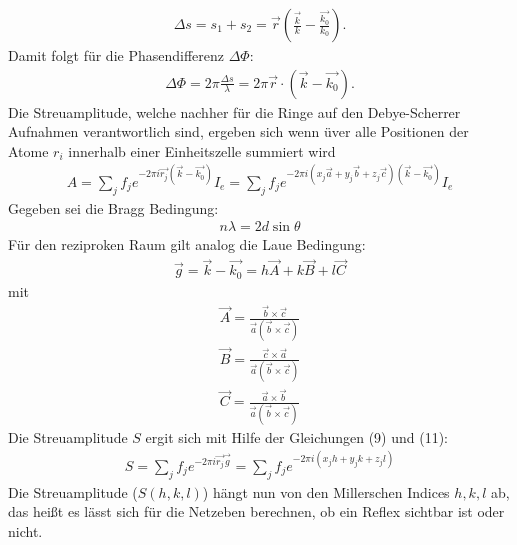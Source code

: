 \begin{align}
    \Delta s= s_1 + s_2= \vec{r} \left(\frac{\vec{k}}{k}-\frac{\vec{k_0}}{k_0} \right).
\end{align}
Damit folgt für die Phasendifferenz $\Delta \Phi$:
\begin{align}
     \Delta \Phi= 2\pi \frac{\Delta s}{\lambda}= 2 \pi \vec{r}\cdot(\vec{k}-\vec{k_0}).
\end{align}
Die Streuamplitude, welche nachher für die Ringe auf den Debye-Scherrer Aufnahmen
verantwortlich sind, ergeben sich wenn üver alle Positionen der Atome $r_i$
innerhalb einer Einheitszelle summiert wird
\begin{align}
A=\sum_j f_j e^{-2 \pi i \vec{r_j} (\vec{k}-\vec{k_0})} I_e=\sum_j f_j e^{-2\pi i (x_j\vec{a}
+y_j \vec{b} + z_j \vec{c})(\vec{k}-\vec{k_0})} I_e
\end{align}
Gegeben sei die Bragg Bedingung:
\begin{align}
n\lambda = 2d \sin \theta
    \label{braggi}
\end{align}
Für den reziproken Raum gilt analog die Laue Bedingung:
\begin{align}
    \vec{g}= \vec{k}-\vec{k_0}= h \vec{A}+ k\vec{B}+l\vec{C}
\end{align}
mit
\begin{align*}
    \vec{A}= \frac{\vec{b} \times \vec{c}} { \vec{a} (\vec{b} \times \vec{c})}\\
    \vec{B}= \frac{\vec{c} \times \vec{a}} { \vec{a} (\vec{b} \times \vec{c})}\\
    \vec{C}= \frac{\vec{a} \times \vec{b}} { \vec{a} (\vec{b} \times \vec{c})}
\end{align*}
Die Streuamplitude $S$ ergit sich mit Hilfe der Gleichungen (9) und (11):
\begin{align}
    S=\sum_j f_j e^{-2 \pi i \vec{r_j} \vec{g}}=\sum_j f_j e^{-2 \pi i(x_j
    h + y_j k + z_j l)}
\label{streu}
\end{align}
Die Streuamplitude ($S(h,k,l)$) hängt nun von den Millerschen Indices $h,k,l$ ab,
das heißt es lässt sich für die Netzeben berechnen, ob ein Reflex sichtbar ist oder nicht.
